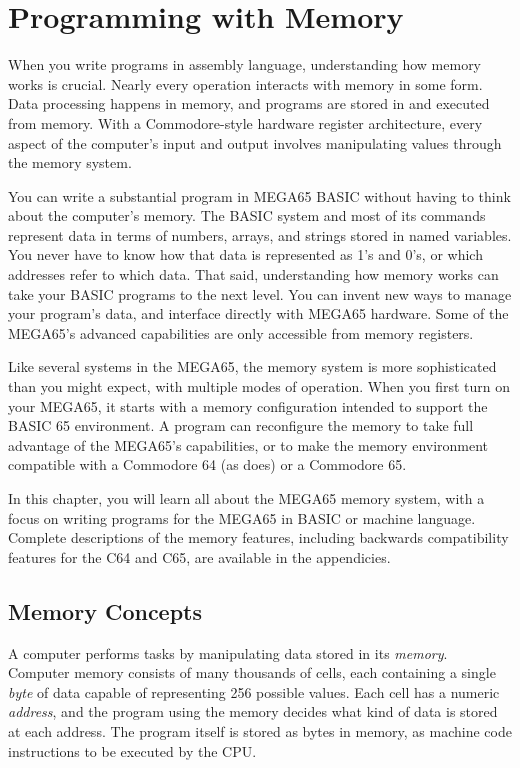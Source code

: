 
\chapter{Programming with Memory}
\label{cha:programming-with-memory}

When you write programs in assembly language, understanding how memory works is
crucial. Nearly every operation interacts with memory in some form. Data
processing happens in memory, and programs are stored in and executed from memory.
With a Commodore-style hardware register architecture, every aspect of the
computer's input and output involves manipulating values through the memory system.

You can write a substantial program in MEGA65 BASIC without having to
think about the computer's memory. The BASIC system and most of its commands
represent data in terms of numbers, arrays, and strings stored in named variables.
You never have to know how that data is represented as 1's and 0's, or which addresses
refer to which data. That said, understanding how memory works can take your
BASIC programs to the next level. You can invent new ways to manage your
program's data, and interface directly with MEGA65 hardware. Some of the
MEGA65's advanced capabilities are only accessible from memory registers.

Like several systems in the MEGA65, the memory system is more sophisticated than you
might expect, with multiple modes of operation. When you first turn on your
MEGA65, it starts with a memory configuration intended to support the
BASIC 65 environment. A program can reconfigure the memory to take full
advantage of the MEGA65's capabilities, or to make the memory environment
compatible with a Commodore 64 (as  does) or a Commodore 65.

In this chapter, you will learn all about the MEGA65 memory system, with a
focus on writing programs for the MEGA65 in BASIC or machine language. Complete
descriptions of the memory features, including backwards compatibility features
for the C64 and C65, are available in the appendicies.

\newpage
\section{Memory Concepts}
\label{sec:programming-with-memory-concepts}

A computer performs tasks by manipulating data stored in its {\em memory}.
Computer memory consists of many thousands of cells, each containing a single
{\em byte} of data capable of representing 256 possible values. Each cell has a numeric
{\em address}, and the program using the memory decides what kind of data is stored
at each address. The program itself is stored as bytes in memory, as
machine code instructions to be executed by the CPU.

